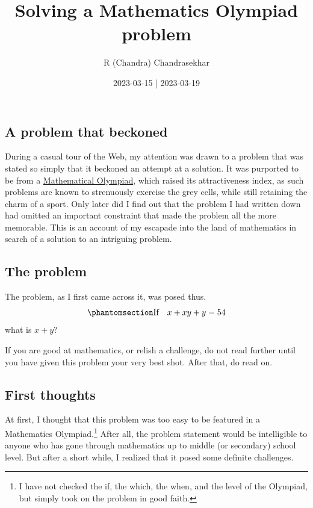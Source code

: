 \documentclass[
  a4paper,
]{article}
\title{Solving a Mathematics Olympiad problem}
\author{R (Chandra) Chandrasekhar}
\date{2023-03-15 | 2023-03-19}
\begin{document}
\maketitle

\thispagestyle{empty}


\subsection{A problem that beckoned}\label{a-problem-that-beckoned}

During a casual tour of the Web, my attention was drawn to a problem
that was stated so simply that it beckoned an attempt at a solution. It
was purported to be from a
\href{https://www.imo-official.org/}{Mathematical Olympiad}, which
raised its attractiveness index, as such problems are known to
strenuously exercise the grey cells, while still retaining the charm of
a sport. Only later did I find out that the problem I had written down
had omitted an important constraint that made the problem all the more
memorable. This is an account of my escapade into the land of
mathematics in search of a solution to an intriguing problem.

\subsection{The problem}\label{the-problem}

The problem, as I first came across it, was posed thus.
\begin{equation}\phantomsection\label{eq:problem}{
\text{If}\quad
x + xy + y = 54
}\end{equation} what is \(x + y\)?

If you are good at mathematics, or relish a challenge, do not read
further until you have given this problem your very best shot. After
that, do read on.

\subsection{First thoughts}\label{first-thoughts}

At first, I thought that this problem was too easy to be featured in a
Mathematics Olympiad.\footnote{I have not checked the if, the which, the
  when, and the level of the Olympiad, but simply took on the problem in
  good faith.} After all, the problem statement would be intelligible to
anyone who has gone through mathematics up to middle (or secondary)
school level. But after a short while, I realized that it posed some
definite challenges.
\end{document}
